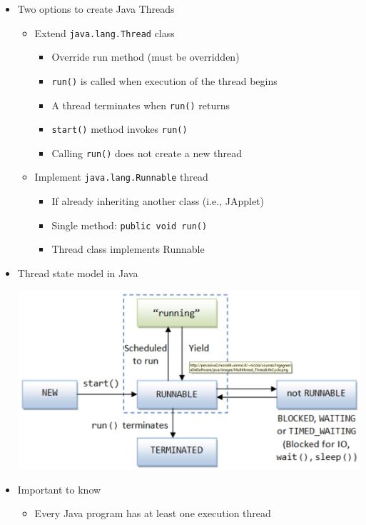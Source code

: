 \documentclass[a4paper]{article}
\newcommand{\inline}[1]{\lstinline!#1!}%
\begin{document}
\begin{itemize}
\begin{center}
			\end{center}
		\item Two options to create Java Threads
			\begin{itemize}
				\item Extend \inline{java.lang.Thread} class
					\begin{itemize}
						\item Override run method (must be overridden)
						\item \inline{run()} is called when execution of the thread begins
						\item A thread terminates when \inline{run()} returns
						\item \inline{start()} method invokes \inline{run()}
						\item Calling \inline{run()} does not create a new thread
					\end{itemize}
				\item Implement \inline{java.lang.Runnable} thread
					\begin{itemize}
						\item If already inheriting another class (i.e., JApplet)
						\item Single method: \inline{public void run()}
						\item Thread class implements Runnable
					\end{itemize}
			\end{itemize}
		\item Thread state model in Java
			\begin{center}
				\includegraphics[scale=1]{Figures/ThreadStateModelInJava.jpg}
			\end{center}
		\item Important to know
			\begin{itemize}
				\item Every Java program has at least one execution thread

\end{itemize}
\end{itemize}
\end{document}
